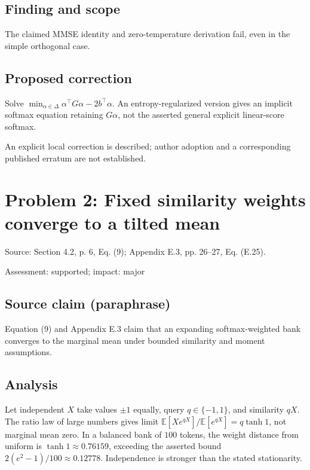 \documentclass[11pt]{article}
\begin{document}
\subsection*{Finding and scope}

The claimed MMSE identity and zero-temperature derivation fail, even in the simple orthogonal case.

\subsection*{Proposed correction}

Solve \(\min_{\alpha\in\Delta}\alpha^\top G\alpha-2b^\top\alpha\). An entropy-regularized version gives an implicit softmax equation retaining \(G\alpha\), not the asserted general explicit linear-score softmax.

An explicit local correction is described; author adoption and a corresponding published erratum are not established.

\section*{Problem 2: Fixed similarity weights converge to a tilted mean}

Source: Section 4.2, p. 6, Eq. (9); Appendix E.3, pp. 26–27, Eq. (E.25).

Assessment: supported; impact: major

\subsection*{Source claim (paraphrase)}

Equation (9) and Appendix E.3 claim that an expanding softmax-weighted bank converges to the marginal mean under bounded similarity and moment assumptions.

\subsection*{Analysis}

Let independent \(X\) take values \(\pm1\) equally, query \(q\in\{-1,1\}\), and similarity \(qX\). The ratio law of large numbers gives limit \(\mathbb E[Xe^{qX}]/\mathbb E[e^{qX}]=q\tanh1\), not marginal mean zero. In a balanced bank of \(100\) tokens, the weight distance from uniform is \(\tanh1\approx0.76159\), exceeding the asserted bound \(2(e^2-1)/100\approx0.12778\). Independence is stronger than the stated stationarity.
\end{document}
